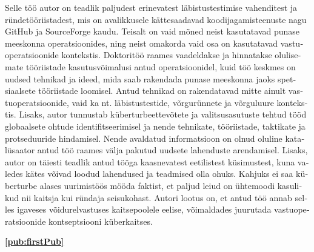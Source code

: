\begin{otherlanguage}{estonian}
Selle töö autor on teadlik paljudest erinevatest läbistustestimise vahenditest ja ründetööriistadest, mis on avalikkusele kättesaadavad koodijagamisteenuste nagu GitHub ja SourceForge kaudu. Teisalt on vaid mõned neist kasutatavad punase meeskonna operatsioonides, ning neist omakorda vaid osa on kasutatavad vastuoperatsioonide kontekstis. Doktoritöö raames vaadeldakse ja hinnatakse olulisemate tööriistade kasutusvõimalusi antud operatsioonidel, kuid töö keskmes on uudsed tehnikad ja ideed, mida saab rakendada punase meeskonna jaoks spetsiaalsete tööriistade loomisel. Antud tehnikad on rakendatavad mitte ainult vastuoperatsioonide, vaid ka nt. läbistustestide, võrgurünnete ja võrguluure kontekstis. Lisaks, autor tunnustab küberturbeettevõtete ja valitsusasutuste tehtud tööd globaalsete ohtude identifitseerimisel ja nende tehnikate, tööriistade, taktikate ja protseduuride hindamisel. Nende avaldatud informatsioon on olnud oluline katalüsaator antud töö raames välja pakutud uudsete lahenduste arendamisel. Lisaks, autor on täiesti teadlik antud tööga kaasnevatest eetilistest küsimustest, kuna valedes kätes võivad loodud lahendused ja teadmised olla ohuks. Kahjuks ei saa küberturbe alases uurimistöös mööda faktist, et paljud leiud on ühtemoodi kasulikud nii kaitsja kui ründaja seisukohast. Autori lootus on, et antud töö annab selles igaveses võidurelvastuses kaitsepoolele eelise, võimaldades juurutada vastuoperatsioonide kontseptsiooni küberkaitses.
\end{otherlanguage}




\vspace{6cm}
{\large
\textbf{\ref{pub:firstPub}} \\
}

